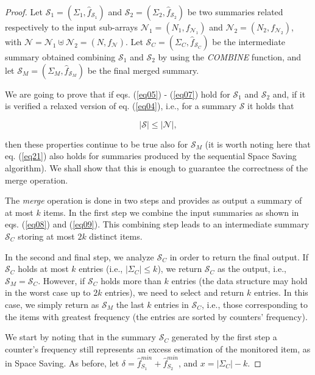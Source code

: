 \documentclass[final,3p,times]{elsarticle}
\newcommand\noi{\noindent}
\begin{document}
\begin{proof}
Let $\mathcal{S}_1 = (\Sigma_1, \hat{f}_{\mathcal{S}_1})$ and $\mathcal{S}_2 = (\Sigma_2, \hat{f}_{\mathcal{S}_2})$ be two summaries related respectively to the input sub-arrays $\mathcal{N}_1 = (N_1, f_{\mathcal{N}_1})$ and $\mathcal{N}_2 = (N_2, f_{\mathcal{N}_2})$, with $\mathcal{N} = \mathcal{N}_1 \uplus \mathcal{N}_2 = (N, f_{\mathcal{N}})$. Let $\mathcal{S}_C = (\Sigma_C, \hat{f}_{\mathcal{S}_C})$ be the intermediate summary obtained combining $\mathcal{S}_1$ and $\mathcal{S}_2$ by using the \textit{COMBINE} function, and let $\mathcal{S}_M = (\Sigma_M, \hat{f}_{\mathcal{S}_M})$ be the final merged summary. 


We are going to prove that if eqs. (\ref{eq05}) - (\ref{eq07}) hold for $\mathcal{S}_1$ and $\mathcal{S}_2$ and, if it is verified a relaxed version of eq. (\ref{eq04}), i.e., for a summary $\mathcal{S}$ it holds that

\begin{equation}
\label{eq21}
\left\vert{\mathcal{S}}\right\vert \leq \left\vert{\mathcal{N}}\right\vert,
\end{equation}

\noi then these properties  continue to be true also for $\mathcal{S}_M$ (it is worth noting here that eq. (\ref{eq21}) also holds for summaries produced by the sequential Space Saving algorithm). We shall show that this is enough to guarantee the correctness of the merge operation. 
 
The \textit{merge} operation is done in two steps and provides as output a summary of at most $k$ items. In the first step we combine the input summaries as shown in eqs. (\ref{eq08}) and (\ref{eq09}). This combining step leads to an intermediate summary $\mathcal{S}_C$ storing at most $2k$ distinct items.

In the second and final step, we analyze $\mathcal{S}_C$ in order to return the final output. If $\mathcal{S}_C$ holds at most $k$ entries (i.e., $\left\vert{\Sigma_C}\right\vert \leq k$), we return $\mathcal{S}_C$ as the output, i.e., $\mathcal{S}_M = \mathcal{S}_C$. However, if $\mathcal{S}_C$ holds more than $k$ entries (the data structure may hold in the worst case up to $2k$ entries), we need to select and return $k$ entries. In this case, we simply return as $\mathcal{S}_M$ the last $k$ entries in $\mathcal{S}_C$, i.e., those corresponding to the items with greatest frequency (the entries are sorted by counters' frequency). 

We start by noting that in the summary $\mathcal{S}_C$ generated by the first step a counter's frequency still represents an excess estimation of the monitored item, as in Space Saving. As before, let $\delta = \hat{f}_{S_1}^{min} +\hat{f}_{S_2}^{min}$, and $x = \left\vert{\Sigma_C}\right\vert - k$. 









\end{proof}
\end{document}
